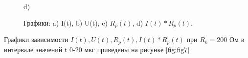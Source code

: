 \begin{figure}[H]
\begin{minipage}[h]{0.47\linewidth}
\end{minipage}
\hfill
\begin{minipage}[h]{0.47\linewidth}
 d) \\
\end{minipage}
\caption{Графики: a) I(t), b)
U(t), c) $R_p(t)$, d) $I(t)*R_p(t)$.}
\label{fig:fig6}
\end{figure}

Графики зависимости $I(t),U(t),R_p(t),I(t)*R_p(t)$ при $R_k=200$ Ом в интервале значений t 0-20 мкс приведены на рисунке \ref{fig:fig7}

\newpage

